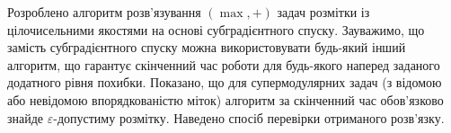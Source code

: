 \chapterConclusion

Розроблено алгоритм розв’язування $(\max ,+)$ задач розмітки із
цілочисельними якостями на основі субградієнтного спуску.
Зауважимо, що замість субградієнтного спуску можна використовувати
будь-який інший алгоритм, що гарантує скінченний час роботи
для будь-якого наперед заданого додатного рівня похибки.
Показано, що для
супермодулярних задач (з відомою або невідомою впорядкованістю міток) алгоритм
за скінченний час обов'язково знайде $\varepsilon$-допустиму розмітку.
Наведено спосіб перевірки отриманого розв'язку.

